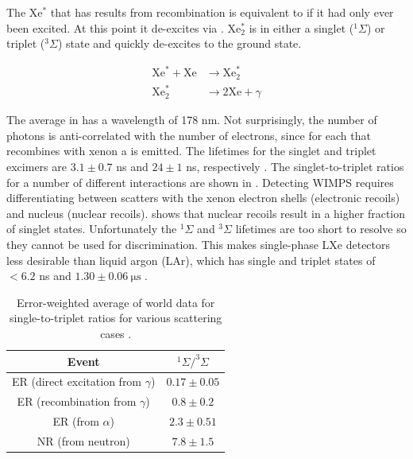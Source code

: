 The Xe$^{*}$ that has results from recombination is equivalent to if it had only ever been excited.  At this point
it de-excites via .  Xe$_{2}^{*}$ is in either a singlet
($^{1}\Sigma$) or triplet ($^{3}\Sigma$) state and quickly de-excites to the ground state.

\begin{subequations}
\begin{align}
\mathrm{Xe}^{*} + \mathrm{Xe} &\rightarrow \mathrm{Xe}_{2}^{*} \\
\mathrm{Xe}_{2}^{*} &\rightarrow 2\mathrm{Xe} + \gamma
\label{eq:deexcite_gamma}
\end{align}
\label{eq:deexcite}
\end{subequations}

The average \gammaray in  has a wavelength of 178 nm.  Not surprisingly, the number of photons is
anti-correlated with the number of electrons, since for each \electron that
recombines with xenon a \gammaray is emitted.  The lifetimes for the singlet and triplet
excimers are $3.1 \pm 0.7$ ns and $24 \pm 1$ ns, respectively .  The singlet-to-triplet ratios for
a number of different interactions are shown in .  Detecting WIMPS requires differentiating between
scatters with the xenon electron shells (electronic recoils) and nucleus (nuclear recoils).   shows that
nuclear recoils result in a higher fraction of singlet states.  Unfortunately the $^1\Sigma$ and $^3\Sigma$ lifetimes
are too short to resolve so they cannot be used for discrimination.  This makes single-phase LXe detectors
less desirable than liquid argon (LAr), which has single and triplet states of $< 6.2$ ns and $1.30 \pm 0.06\ \mathrm{\mu s}$
.

\begin{table}[t]
 \centering
 \begin{tabular}{cc}
 \hline
 \hline
 Event & $^1\Sigma / ^3\Sigma$ \\
 \hline
 ER (direct excitation from $\gamma$) & $0.17 \pm 0.05$ \\
 ER (recombination from $\gamma$) & $0.8 \pm 0.2$ \\
 ER (from $\alpha$) & $2.3 \pm 0.51$ \\
 NR (from neutron) & $7.8 \pm 1.5$ \\
 \hline
 \hline
 \end{tabular}
 \caption{Error-weighted average of world data for single-to-triplet ratios for various scattering cases .}
\label{tab:singlet_to_triplet}
\end{table}

